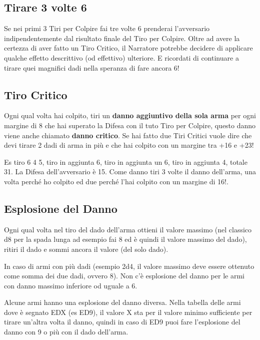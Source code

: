 \begin{multicols}{2}
\subsection{Tirare 3 volte 6}\label{tiraretrevoltesei}

Se nei primi 3 Tiri per Colpire fai tre volte 6 prenderai l'avversario indipendentemente dal risultato finale del Tiro per Colpire. Oltre ad avere la certezza di aver fatto un Tiro Critico, il Narratore potrebbe decidere di applicare qualche effetto descrittivo (od effettivo) ulteriore. E ricordati di continuare a tirare quei magnifici dadi nella speranza di fare ancora 6!

\subsection{Tiro Critico}\label{tirocritico}

Ogni qual volta hai colpito, tiri un \textbf{danno aggiuntivo della sola arma} per ogni margine di 8 che hai superato la Difesa con il tuto Tiro per Colpire, questo danno viene anche chiamato \textbf{danno critico}. Se hai fatto due Tiri Critici vuole dire che devi tirare 2 dadi di arma in più e che hai colpito con un margine tra +16 e +23!

\begin{giocatore}
Es tiro 6 4 5, tiro in aggiunta 6, tiro in aggiunta un 6, tiro in aggiunta 4, totale 31. La Difesa dell'avversario è 15. Come danno tiri 3 volte il danno dell'arma, una volta perché ho colpito ed due perché l'hai colpito con un margine di 16!.
\end{giocatore}


\subsection{Esplosione del Danno}\label{esplosionedeldanno}

Ogni qual volta nel tiro del dado dell'arma ottieni il valore massimo (nel classico d8 per la spada lunga ad esempio fai 8 ed è quindi il valore massimo del dado), ritiri il dado e sommi ancora il valore (del solo dado).

In caso di armi con più dadi (esempio 2d4, il valore massimo deve essere ottenuto come somma dei due dadi, ovvero 8). Non c'è esplosione del danno per le armi con danno massimo inferiore od uguale a 6.

Alcune armi hanno una esplosione del danno diversa. Nella tabella delle armi dove è segnato EDX (es ED9), il valore X sta per il valore minimo sufficiente per tirare un'altra volta il danno, quindi in caso di ED9 puoi fare l'esplosione del danno con 9 o più con il dado dell'arma.


\end{multicols}
